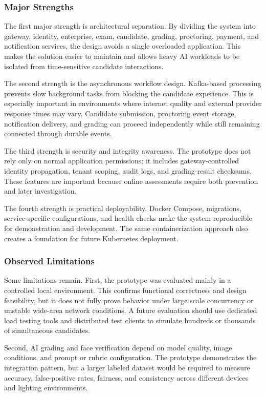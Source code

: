 \subsubsection{Major Strengths}
The first major strength is architectural separation. By dividing the system into gateway, identity, enterprise, exam, candidate, grading, proctoring, payment, and notification services, the design avoids a single overloaded application. This makes the solution easier to maintain and allows heavy AI workloads to be isolated from time-sensitive candidate interactions.

The second strength is the asynchronous workflow design. Kafka-based processing prevents slow background tasks from blocking the candidate experience. This is especially important in environments where internet quality and external provider response times may vary. Candidate submission, proctoring event storage, notification delivery, and grading can proceed independently while still remaining connected through durable events.

The third strength is security and integrity awareness. The prototype does not rely only on normal application permissions; it includes gateway-controlled identity propagation, tenant scoping, audit logs, and grading-result checksums. These features are important because online assessments require both prevention and later investigation.

The fourth strength is practical deployability. Docker Compose, migrations, service-specific configurations, and health checks make the system reproducible for demonstration and development. The same containerization approach also creates a foundation for future Kubernetes deployment.

\subsubsection{Observed Limitations}
Some limitations remain. First, the prototype was evaluated mainly in a controlled local environment. This confirms functional correctness and design feasibility, but it does not fully prove behavior under large scale concurrency or unstable wide-area network conditions. A future evaluation should use dedicated load testing tools and distributed test clients to simulate hundreds or thousands of simultaneous candidates.

Second, AI grading and face verification depend on model quality, image conditions, and prompt or rubric configuration. The prototype demonstrates the integration pattern, but a larger labeled dataset would be required to measure accuracy, false-positive rates, fairness, and consistency across different devices and lighting environments.

